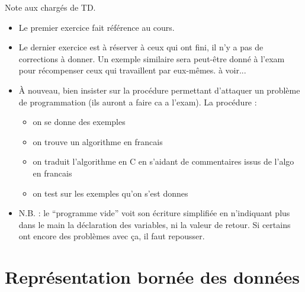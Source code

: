 
\newcommand{\commentaire}[1]{}

\vspace{-1cm}
\begin{correction}
  Note aux chargés de TD.
  \begin{itemize}
  \item Le premier exercice fait référence au cours.
  \item Le dernier exercice est à réserver à ceux qui ont fini, il n'y a pas de corrections à donner. Un exemple similaire sera peut-être donné à l'exam pour récompenser ceux qui travaillent par eux-mêmes. à voir...
  \item À nouveau, bien insister sur la procédure permettant d'attaquer un problème de programmation (ils auront a faire ca a l'exam). La procédure :
    \begin{itemize}
    \item on se donne des exemples
    \item on trouve un algorithme en francais
    \item on traduit l'algorithme en C en s'aidant de commentaires issus de l'algo en francais
    \item on test sur les exemples qu'on s'est donnes
    \end{itemize}
  \item N.B. : le ``programme vide'' voit son écriture simplifiée en n'indiquant plus dans le main la déclaration des variables, ni la valeur de retour. Si certains ont encore des problèmes avec ça, il faut repousser.
  \end{itemize}
\end{correction}

\section{Représentation bornée des données}

